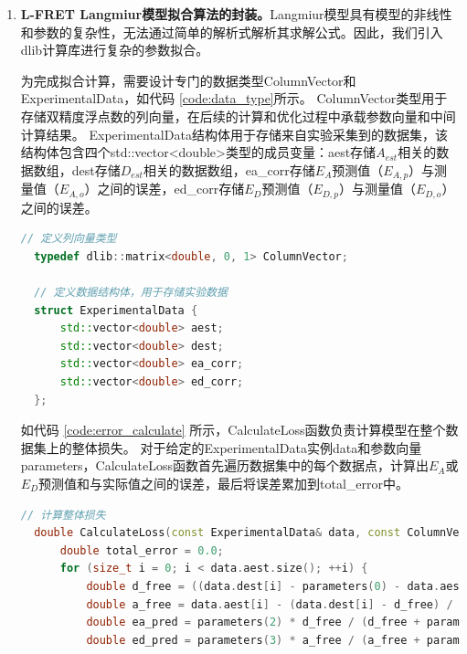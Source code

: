 \begin{enumerate}
  \item \textbf{L-FRET Langmiur模型拟合算法的封装。}Langmiur模型具有模型的非线性和参数的复杂性，无法通过简单的解析式解析其求解公式。因此，我们引入dlib计算库进行复杂的参数拟合。

  为完成拟合计算，需要设计专门的数据类型ColumnVector和ExperimentalData，如代码 \ref{code:data_type}所示。
  ColumnVector类型用于存储双精度浮点数的列向量，在后续的计算和优化过程中承载参数向量和中间计算结果。
  ExperimentalData结构体用于存储来自实验采集到的数据集，该结构体包含四个std::vector<double>类型的成员变量：aest存储$A_{est}$相关的数据数组，dest存储$D_{est}$相关的数据数组，ea\_corr存储$E_A$预测值（$E_{A,p}$）与测量值（$E_{A,o}$）之间的误差，ed\_corr存储$E_D$预测值（$E_{D,p}$）与测量值（$E_{D,o}$）之间的误差。
  \begin{lstlisting}[language=C++, caption={数据类型}, label={code:data_type}]  
  // 定义列向量类型
  typedef dlib::matrix<double, 0, 1> ColumnVector;
  
  // 定义数据结构体，用于存储实验数据
  struct ExperimentalData {
      std::vector<double> aest;
      std::vector<double> dest;
      std::vector<double> ea_corr;
      std::vector<double> ed_corr;
  };
  \end{lstlisting}
  如代码 \ref{code:error_calculate} 所示，CalculateLoss函数负责计算模型在整个数据集上的整体损失。
  对于给定的ExperimentalData实例data和参数向量parameters，CalculateLoss函数首先遍历数据集中的每个数据点，计算出$E_A$或$E_D$预测值和与实际值之间的误差，最后将误差累加到total\_error中。
  \begin{lstlisting}[language=C++, caption={误差计算函数}, label={code:error_calculate}]
  // 计算整体损失
  double CalculateLoss(const ExperimentalData& data, const ColumnVector& parameters) {
      double total_error = 0.0;
      for (size_t i = 0; i < data.aest.size(); ++i) {
          double d_free = ((data.dest[i] - parameters(0) - data.aest[i] * parameters(1)) + std::sqrt(std::pow(data.dest[i] - parameters(0) - data.aest[i] * parameters(1), 2) + 4 * parameters(0) * data.dest[i])) / 2;
          double a_free = data.aest[i] - (data.dest[i] - d_free) / parameters(1);
          double ea_pred = parameters(2) * d_free / (d_free + parameters(0));
          double ed_pred = parameters(3) * a_free / (a_free + parameters(0) / parameters(1));
  

\end{lstlisting}
\end{enumerate}
